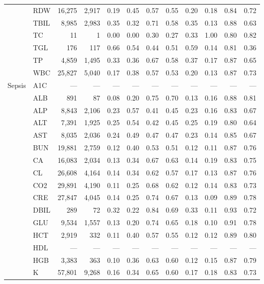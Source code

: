\begin{table}[ht]
\begin{tabular}{llrrrrrrrrrr}
 & RDW & 16,275 & 2,917 & 0.19 & 0.45 & 0.57 & 0.55 & 0.20 & 0.18 & 0.84 & 0.72 \\
 & TBIL & 8,985 & 2,983 & 0.35 & 0.32 & 0.71 & 0.58 & 0.35 & 0.13 & 0.88 & 0.63 \\
 & TC & 11 & 1 & 0.00 & 0.00 & 0.30 & 0.27 & 0.33 & 1.00 & 0.80 & 0.82 \\
 & TGL & 176 & 117 & 0.66 & 0.54 & 0.44 & 0.51 & 0.59 & 0.14 & 0.81 & 0.36 \\
 & TP & 4,859 & 1,495 & 0.33 & 0.36 & 0.67 & 0.58 & 0.37 & 0.17 & 0.87 & 0.65 \\
 & WBC & 25,827 & 5,040 & 0.17 & 0.38 & 0.57 & 0.53 & 0.20 & 0.13 & 0.87 & 0.73 \\
\midrule
Sepsis & A1C & --- & --- & --- & --- & --- & --- & --- & --- & --- & --- \\
 & ALB & 891 & 87 & 0.08 & 0.20 & 0.75 & 0.70 & 0.13 & 0.16 & 0.88 & 0.81 \\
 & ALP & 8,843 & 2,106 & 0.23 & 0.57 & 0.41 & 0.45 & 0.23 & 0.16 & 0.83 & 0.67 \\
 & ALT & 7,391 & 1,925 & 0.25 & 0.54 & 0.42 & 0.45 & 0.25 & 0.19 & 0.80 & 0.64 \\
 & AST & 8,035 & 2,036 & 0.24 & 0.49 & 0.47 & 0.47 & 0.23 & 0.14 & 0.85 & 0.67 \\
 & BUN & 19,881 & 2,759 & 0.12 & 0.40 & 0.53 & 0.51 & 0.12 & 0.11 & 0.87 & 0.76 \\
 & CA & 16,083 & 2,034 & 0.13 & 0.34 & 0.67 & 0.63 & 0.14 & 0.19 & 0.83 & 0.75 \\
 & CL & 26,608 & 4,164 & 0.14 & 0.34 & 0.62 & 0.57 & 0.17 & 0.13 & 0.87 & 0.76 \\
 & CO2 & 29,891 & 4,190 & 0.11 & 0.25 & 0.68 & 0.62 & 0.12 & 0.14 & 0.83 & 0.73 \\
 & CRE & 27,847 & 4,045 & 0.14 & 0.25 & 0.74 & 0.67 & 0.13 & 0.09 & 0.89 & 0.78 \\
 & DBIL & 289 & 72 & 0.32 & 0.22 & 0.84 & 0.69 & 0.33 & 0.11 & 0.93 & 0.72 \\
 & GLU & 9,534 & 1,557 & 0.13 & 0.20 & 0.74 & 0.65 & 0.18 & 0.10 & 0.91 & 0.78 \\
 & HCT & 2,919 & 332 & 0.11 & 0.40 & 0.57 & 0.55 & 0.12 & 0.12 & 0.89 & 0.80 \\
 & HDL & --- & --- & --- & --- & --- & --- & --- & --- & --- & --- \\
 & HGB & 3,383 & 363 & 0.10 & 0.36 & 0.63 & 0.60 & 0.12 & 0.15 & 0.87 & 0.79 \\
 & K & 57,801 & 9,268 & 0.16 & 0.34 & 0.65 & 0.60 & 0.17 & 0.18 & 0.83 & 0.73 \\

\end{tabular}
\end{table}
